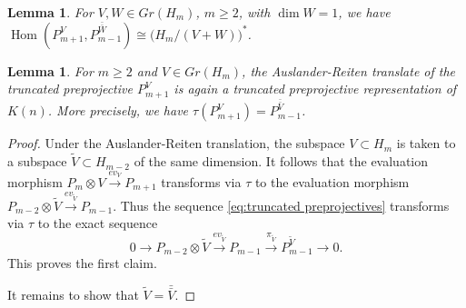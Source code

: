 \documentclass{amsart}
\newtheorem{lemma}[theorem]{Lemma}
\newcommand{\Hom}{\operatorname{Hom}}
\begin{document}
\begin{lemma}
  For $V,W\in Gr(H_m)$, $m\ge2$, with $\dim W=1$, we have $\Hom(P_{m+1}^V,P_{m-1}^{\bar{\bar{W}}})\cong\big(H_m/(V+W)\big)^*$.
\end{lemma}

\begin{lemma}
  For $m\ge2$ and $V\in Gr(H_m)$, the Auslander-Reiten translate of the truncated preprojective $P_{m+1}^V$ is again a truncated preprojective representation of $K(n)$.  More precisely, we have $\tau(P_{m+1}^V)=P_{m-1}^{\bar{\bar{V}}}$.
\end{lemma}
\begin{proof}
  Under the Auslander-Reiten translation, the subspace $V\subset H_m$ is taken to a subspace $\tilde V\subset H_{m-2}$ of the same dimension.
  It follows that the evaluation morphism $P_m\otimes V\stackrel{ev_V}{\longrightarrow} P_{m+1}$ transforms via $\tau$ to the evaluation morphism $P_{m-2}\otimes\tilde V\stackrel{ev_{\tilde V}}{\longrightarrow} P_{m-1}$.
  Thus the sequence \eqref{eq:truncated preprojectives} transforms via $\tau$ to the exact sequence
  \[0\longrightarrow P_{m-2}\otimes \tilde V\stackrel{ev_{\tilde V}}{\longrightarrow} P_{m-1}\stackrel{\pi_{\tilde V}}{\longrightarrow} P_{m-1}^{\tilde V}\longrightarrow 0.\]
  This proves the first claim.

  It remains to show that $\tilde V=\bar{\bar{V}}$.
\end{proof}
\end{document}
